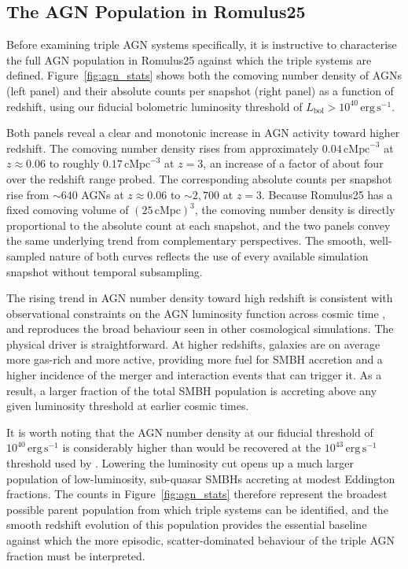 \documentclass[twocolumn, 10pt]{article}
\begin{document}
\subsection{The AGN Population in Romulus25}
\label{subsec:agn_population}
 
Before examining triple AGN systems specifically, it is instructive to characterise the full AGN population in Romulus25 against which the triple systems are defined. Figure~\ref{fig:agn_stats} shows both the comoving number density of AGNs (left panel) and their absolute counts per snapshot (right panel) as a function of redshift, using our fiducial bolometric luminosity threshold of $L_\mathrm{bol} > 10^{40}\,\mathrm{erg\,s^{-1}}$.
 
Both panels reveal a clear and monotonic increase in AGN activity toward higher redshift. The comoving number density rises from approximately $0.04\,\mathrm{cMpc}^{-3}$ at $z \approx 0.06$ to roughly $0.17\,\mathrm{cMpc}^{-3}$ at $z = 3$, an increase of a factor of about four over the redshift range probed. The corresponding absolute counts per snapshot rise from $\sim 640$ AGNs at $z \approx 0.06$ to $\sim 2{,}700$ at $z = 3$. Because Romulus25 has a fixed comoving volume of $(25\,\mathrm{cMpc})^3$, the comoving number density is directly proportional to the absolute count at each snapshot, and the two panels convey the same underlying trend from complementary perspectives. The smooth, well-sampled nature of both curves reflects the use of every available simulation snapshot without temporal subsampling.
 
The rising trend in AGN number density toward high redshift is consistent with observational constraints on the AGN luminosity function across cosmic time \citep[e.g.][]{Ueda2014}, and reproduces the broad behaviour seen in other cosmological simulations. The physical driver is straightforward. At higher redshifts, galaxies are on average more gas-rich and more active, providing more fuel for SMBH accretion and a higher incidence of the merger and interaction events that can trigger it. As a result, a larger fraction of the total SMBH population is accreting above any given luminosity threshold at earlier cosmic times.
 
It is worth noting that the AGN number density at our fiducial threshold of $10^{40}\,\mathrm{erg\,s^{-1}}$ is considerably higher than would be recovered at the $10^{43}\,\mathrm{erg\,s^{-1}}$ threshold used by \citet{Saeedzadeh2024}. Lowering the luminosity cut opens up a much larger population of low-luminosity, sub-quasar SMBHs accreting at modest Eddington fractions. The counts in Figure~\ref{fig:agn_stats} therefore represent the broadest possible parent population from which triple systems can be identified, and the smooth redshift evolution of this population provides the essential baseline against which the more episodic, scatter-dominated behaviour of the triple AGN fraction must be interpreted.
\end{document}
